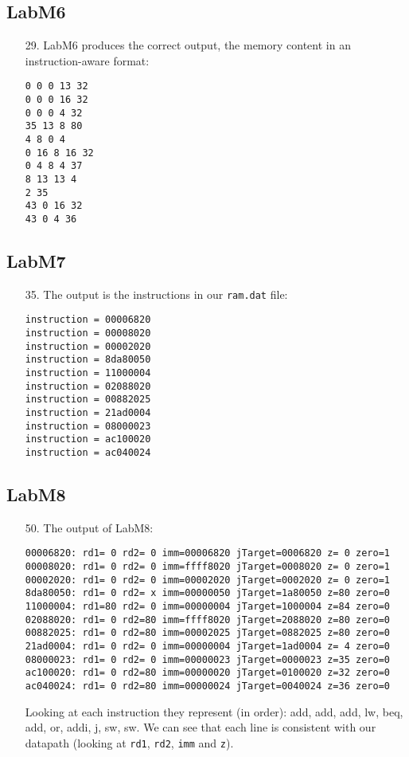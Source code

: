 \documentclass{article}
\begin{document}
\subsection{LabM6}
\begin{enumerate}
\item[29. ] LabM6 produces the correct output, the memory content in an
instruction-aware format:
\begin{verbatim}
0 0 0 13 32
0 0 0 16 32
0 0 0 4 32
35 13 8 80
4 8 0 4
0 16 8 16 32
0 4 8 4 37
8 13 13 4
2 35
43 0 16 32
43 0 4 36
\end{verbatim}
\end{enumerate}

\subsection{LabM7}
\begin{enumerate}
\item[35. ] The output is the instructions in our \verb$ram.dat$ file:
\begin{verbatim}
instruction = 00006820
instruction = 00008020
instruction = 00002020
instruction = 8da80050
instruction = 11000004
instruction = 02088020
instruction = 00882025
instruction = 21ad0004
instruction = 08000023
instruction = ac100020
instruction = ac040024
\end{verbatim}
\end{enumerate}

\pagebreak

\subsection{LabM8}
\begin{enumerate}
\item[50. ] The output of LabM8:
\begin{verbatim}
00006820: rd1= 0 rd2= 0 imm=00006820 jTarget=0006820 z= 0 zero=1
00008020: rd1= 0 rd2= 0 imm=ffff8020 jTarget=0008020 z= 0 zero=1
00002020: rd1= 0 rd2= 0 imm=00002020 jTarget=0002020 z= 0 zero=1
8da80050: rd1= 0 rd2= x imm=00000050 jTarget=1a80050 z=80 zero=0
11000004: rd1=80 rd2= 0 imm=00000004 jTarget=1000004 z=84 zero=0
02088020: rd1= 0 rd2=80 imm=ffff8020 jTarget=2088020 z=80 zero=0
00882025: rd1= 0 rd2=80 imm=00002025 jTarget=0882025 z=80 zero=0
21ad0004: rd1= 0 rd2= 0 imm=00000004 jTarget=1ad0004 z= 4 zero=0
08000023: rd1= 0 rd2= 0 imm=00000023 jTarget=0000023 z=35 zero=0
ac100020: rd1= 0 rd2=80 imm=00000020 jTarget=0100020 z=32 zero=0
ac040024: rd1= 0 rd2=80 imm=00000024 jTarget=0040024 z=36 zero=0
\end{verbatim}
  Looking at each instruction they represent (in order): add, add, add, lw, beq,
add, or, addi, j, sw, sw. We can see that each line is consistent with our
datapath (looking at \verb$rd1$, \verb$rd2$, \verb$imm$ and \verb$z$).
\end{enumerate}
\end{document}
